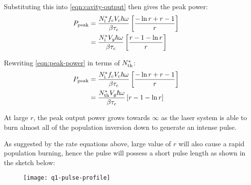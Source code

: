\begin{parts}
	Substituting this into \eqref{eqn:cavity-output} then gives the peak power:
	\begin{align}
		P_\textnormal{peak} &= \frac{N^*_\textnormal{i} f_c V_c \hbar\omega}{\beta\tau_c} \left[ \frac{-\ln r + r - 1}{r} \right] \notag \\
		&= \frac{N^*_\textnormal{i} V_g \hbar\omega}{\beta\tau_c} \left[ \frac{r-1-\ln r}{r} \right] \label{eqn:peak-power}
	\end{align}
	
	Rewriting \eqref{eqn:peak-power} in terms of $N^*_\textnormal{th}$:
	\begin{align*}
		P_\textnormal{peak} &= \frac{N^*_\textnormal{i} f_c V_c \hbar\omega}{\beta\tau_c} \left[ \frac{-\ln r + r - 1}{r} \right] \notag \\
		&= \frac{N^*_\textnormal{th} V_g \hbar\omega}{\beta\tau_c} \left[ r-1-\ln r \right]
	\end{align*}
	
	At large $r$, the peak output power grows towards $\infty$ as the laser system is able to burn almost all of the population inversion down to generate an intense pulse.
	
	As suggested by the rate equations above, large value of $r$ will also cause a rapid population burning, hence the pulse will possess a short pulse length as shown in the sketch below:
	\begin{figure}[H]
		\centering
		\texttt{[image: q1-pulse-profile]}
	\end{figure}
\end{parts}